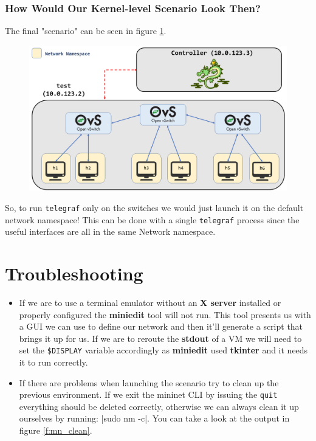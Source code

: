 \documentclass[12pt]{article}
\begin{document}
		\subsubsection{How Would Our Kernel-level Scenario Look Then?}

		The final "scenario" can be seen in figure \ref{f:scenario_kernel}.

		\begin{figure}[!htb]
			\centering
			\includegraphics[width=\linewidth]{scenario_kernel.png}
			\label{f:scenario_kernel}
		\end{figure}

		So, to run \texttt{telegraf} only on the switches we would just launch it on the default network namespace! This can be done with a single \texttt{telegraf} process since the useful interfaces are all in the same Network namespace.

\newpage

\section{Troubleshooting}
	\begin{itemize}
		\item If we are to use a terminal emulator without an \textbf{X server} installed or properly configured the \textbf{miniedit} tool will not run. This tool presents us with a GUI we can use to define our network and then it'll generate a script that brings it up for us. If we are to reroute the \textbf{stdout} of a VM we will need to set the \texttt{\$DISPLAY} variable accordingly as \textbf{miniedit} used \textbf{tkinter} and it needs it to run correctly.
		\item If there are problems when launching the scenario try to clean up the previous environment. If we exit the mininet CLI by issuing the \texttt{quit} everything should be deleted correctly, otherwise we can always clean it up ourselves by running: |sudo nm -c|. You can take a look at the output in figure \ref{f:mn_clean}.
	\end{itemize}
\end{document}
